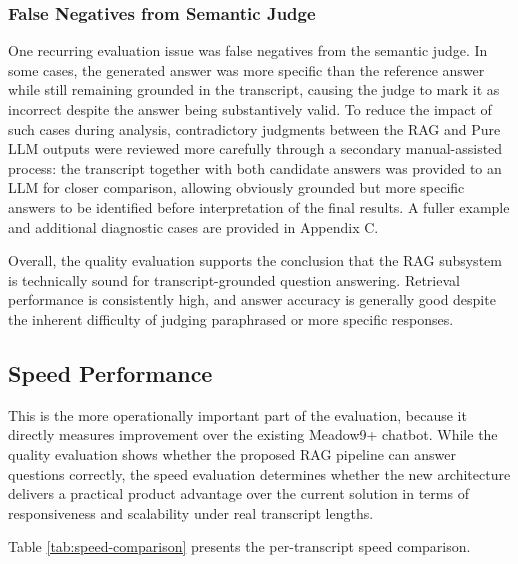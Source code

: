 \subsubsection*{False Negatives from Semantic Judge}
One recurring evaluation issue was false negatives from the semantic judge. In some cases, the generated answer was more specific than the reference answer while still remaining grounded in the transcript, causing the judge to mark it as incorrect despite the answer being substantively valid. To reduce the impact of such cases during analysis, contradictory judgments between the RAG and Pure LLM outputs were reviewed more carefully through a secondary manual-assisted process: the transcript together with both candidate answers was provided to an LLM for closer comparison, allowing obviously grounded but more specific answers to be identified before interpretation of the final results. A fuller example and additional diagnostic cases are provided in Appendix C.

Overall, the quality evaluation supports the conclusion that the RAG subsystem is technically sound for transcript-grounded question answering. Retrieval performance is consistently high, and answer accuracy is generally good despite the inherent difficulty of judging paraphrased or more specific responses.

\subsection{Speed Performance}
This is the more operationally important part of the evaluation, because it directly measures improvement over the existing Meadow9+ chatbot. While the quality evaluation shows whether the proposed RAG pipeline can answer questions correctly, the speed evaluation determines whether the new architecture delivers a practical product advantage over the current solution in terms of responsiveness and scalability under real transcript lengths.

Table \ref{tab:speed-comparison} presents the per-transcript speed comparison.

